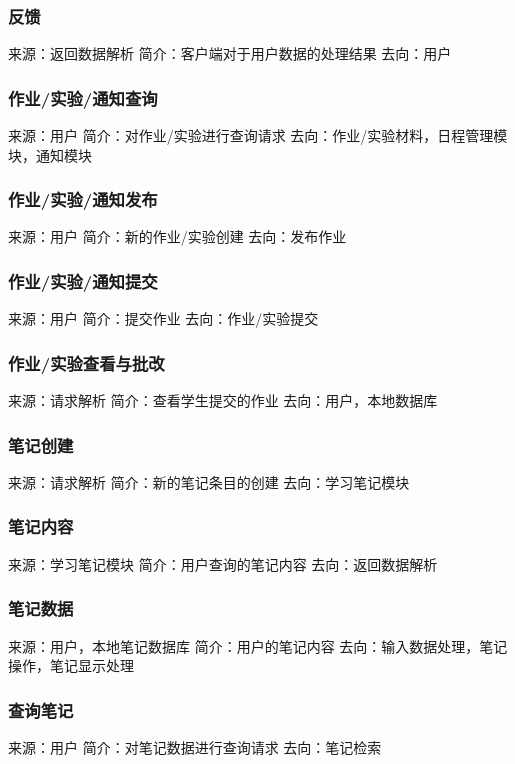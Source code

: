 \subsubsection{反馈}
来源：返回数据解析
简介：客户端对于用户数据的处理结果
去向：用户

\subsubsection{作业/实验/通知查询}
来源：用户
简介：对作业/实验进行查询请求
去向：作业/实验材料，日程管理模块，通知模块

\subsubsection{作业/实验/通知发布}
来源：用户
简介：新的作业/实验创建
去向：发布作业

\subsubsection{作业/实验/通知提交}
来源：用户
简介：提交作业
去向：作业/实验提交

\subsubsection{作业/实验查看与批改}
来源：请求解析
简介：查看学生提交的作业
去向：用户，本地数据库

\subsubsection{笔记创建}
来源：请求解析
简介：新的笔记条目的创建
去向：学习笔记模块

\subsubsection{笔记内容}
来源：学习笔记模块
简介：用户查询的笔记内容
去向：返回数据解析




\subsubsection{笔记数据}
来源：用户，本地笔记数据库
简介：用户的笔记内容
去向：输入数据处理，笔记操作，笔记显示处理

\subsubsection{查询笔记}
来源：用户
简介：对笔记数据进行查询请求
去向：笔记检索

